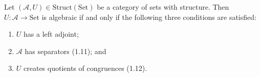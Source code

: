 Let $(\mathcal{A}, U) \in \text{Struct}(\text{Set})$ be a category of sets with structure. Then $U: \mathcal{A} \longrightarrow \text{Set}$ is algebraic if and only if the following three conditions are satisfied:

\begin{enumerate}
\item $U$ has a left adjoint;
\item $\mathcal{A}$ has separators (1.11); and
\item $U$ creates quotients of congruences (1.12).
\end{enumerate}
